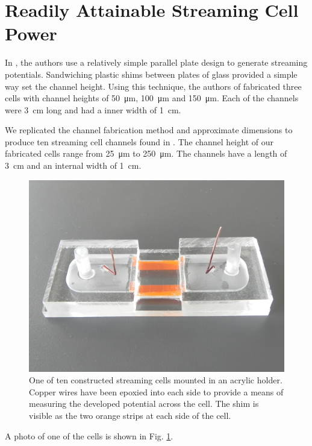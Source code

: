 \documentclass[10pt,final,journal]{IEEEtran}
\begin{document}
    \section{Readily Attainable Streaming Cell Power} \label{sect:streamingCell}
    In \cite{Gu2000}, the authors use a relatively simple parallel plate design to generate streaming potentials.
    Sandwiching plastic shims between plates of glass provided a simple way set the channel height.
    Using this technique, the authors of \cite{Gu2000} fabricated three cells with channel heights of \SI{50}{\micro\metre}, \SI{100}{\micro\metre} and \SI{150}{\micro\metre}.
    Each of the channels were \SI{3}{\centi\metre} long and had a inner width of \SI{1}{\centi\metre}.

    We replicated the channel fabrication method and approximate dimensions to produce ten streaming cell channels found in \cite{Gu2000}.
    The channel height of our fabricated cells range from \SI{25}{\micro\metre} to \SI{250}{\micro\metre}.
    The channels have a length of \SI{3}{\centi\metre} and an internal width of \SI{1}{\centi\metre}.
    \begin{figure}
        \begin{center}
        \includegraphics[width=\linewidth]{Photo_streamingPotential_Assembly_Step3.JPG}
        \end{center}
        \caption{One of ten constructed streaming cells mounted in an acrylic holder. Copper wires have been epoxied into each side to provide a means of measuring the developed potential across the cell. The shim is visible as the two orange strips at each side of the cell.}
        \label{fig:cell}
    \end{figure}
    A photo of one of the cells is shown in Fig. \ref{fig:cell}.
\end{document}
